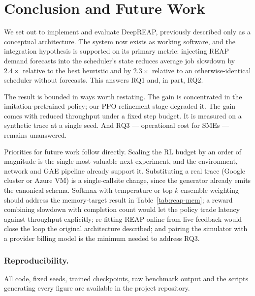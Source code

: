 \documentclass[runningheads]{llncs}
\begin{document}
\section{Conclusion and Future Work}
\label{sec:future}

We set out to implement and evaluate DeepREAP, previously described
only as a conceptual architecture. The system now exists as working
software, and the integration hypothesis is supported on its primary
metric: injecting REAP demand forecasts into the scheduler's state
reduces average job slowdown by $2.4\times$ relative to the best
heuristic and by $2.3\times$ relative to an otherwise-identical
scheduler without forecasts. This answers RQ1 and, in part, RQ2.

The result is bounded in ways worth restating. The gain is
concentrated in the imitation-pretrained policy; our PPO refinement
stage degraded it. The gain comes with reduced throughput under a
fixed step budget. It is measured on a synthetic trace at a single
seed. And RQ3 --- operational cost for SMEs --- remains unanswered.

Priorities for future work follow directly. Scaling the RL budget by
an order of magnitude is the single most valuable next experiment, and
the environment, network and GAE pipeline already support it.
Substituting a real trace (Google cluster or Azure VM) is a
single-callsite change, since the generator already emits the
canonical schema. Softmax-with-temperature or top-$k$ ensemble
weighting should address the memory-target result in
Table~\ref{tab:reap-mem}; a reward combining slowdown with completion
count would let the policy trade latency against throughput
explicitly; re-fitting REAP online from live feedback would close the
loop the original architecture described; and pairing the simulator
with a provider billing model is the minimum needed to address RQ3.

\subsubsection{Reproducibility.}
All code, fixed seeds, trained checkpoints, raw benchmark output and
the scripts generating every figure are available in the project
repository.
\end{document}
